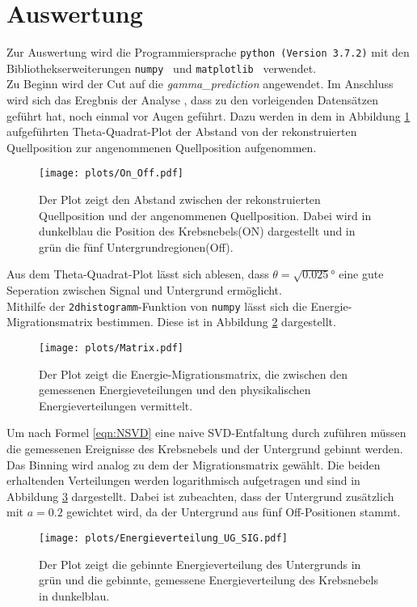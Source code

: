 \section{Auswertung}
Zur Auswertung wird die Programmiersprache \texttt{python (Version 3.7.2)} mit
den Bibliothekserweiterungen \texttt{numpy}~\cite{numpy} und \texttt{matplotlib}~\cite{matplotlib} verwendet.\\
Zu Beginn wird der Cut auf die \textit{gamma\_prediction} angewendet. Im Anschluss wird sich das Eregbnis der Analyse \cite{FACTanalyse}, dass zu den vorleigenden Datensätzen geführt hat, noch einmal vor Augen geführt. Dazu werden in dem in Abbildung \ref{fig:Theta2} aufgeführten Theta-Quadrat-Plot der Abstand von der rekonstruierten Quellposition zur angenommenen Quellposition aufgenommen. \\
\begin{figure}
  \centering
  \texttt{[image: plots/On\_Off.pdf]}
  \caption{Der Plot zeigt den Abstand zwischen der rekonstruierten Quellposition und der angenommenen Quellposition. Dabei wird in dunkelblau die Position des Krebsnebels(ON) dargestellt und in grün die fünf Untergrundregionen(Off).}
  \label{fig:Theta2}
\end{figure}
Aus dem Theta-Quadrat-Plot lässt sich ablesen, dass $\theta = \sqrt{0.025}\si{\degree}$ eine gute Seperation zwischen Signal und Untergrund ermöglicht.\\
Mithilfe der \texttt{2dhistogramm}-Funktion von \texttt{numpy} lässt sich die Energie-Migrationsmatrix bestimmen. Diese ist in Abbildung \ref{fig:mig} dargestellt.\\
\begin{figure}
  \centering
  \texttt{[image: plots/Matrix.pdf]}
  \caption{Der Plot zeigt die Energie-Migrationsmatrix, die zwischen den gemessenen Energieveteilungen und den physikalischen Energieverteilungen vermittelt.}
  \label{fig:mig}
\end{figure}
Um nach Formel \eqref{eqn:NSVD} eine naive SVD-Entfaltung durch zuführen müssen die gemessenen Ereignisse des Krebsnebels und der Untergrund gebinnt werden. Das Binning wird analog zu dem der Migrationsmatrix gewählt. Die beiden erhaltenden Verteilungen werden logarithmisch aufgetragen und sind in Abbildung \ref{fig:UG_Sig} dargestellt. Dabei ist zubeachten, dass der Untergrund zusätzlich mit $a=0.2$ gewichtet wird, da der Untergrund aus fünf Off-Positionen stammt.\\
\begin{figure}
  \centering
  \texttt{[image: plots/Energieverteilung\_UG\_SIG.pdf]}
  \caption{Der Plot zeigt die gebinnte Energieverteilung des Untergrunds in grün und die gebinnte, gemessene Energieverteilung des Krebsnebels in dunkelblau.}
  \label{fig:UG_Sig}
\end{figure}
